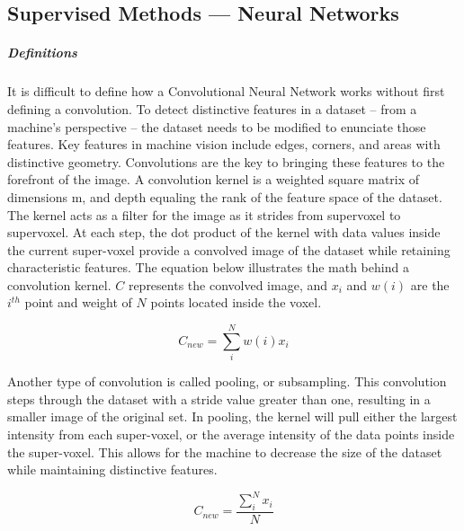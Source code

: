 \documentclass[12pt]{drexelthesis}
\let\Oldsubsection\subsection
\renewcommand{\subsection}{\FloatBarrier\Oldsubsection}
\begin{document}
\subsection{Supervised Methods --- Neural Networks}
\subparagraph{Definitions}
It is difficult to define how a Convolutional Neural Network works without first defining a convolution. To detect distinctive features in a dataset – from a machine’s perspective – the dataset needs to be modified to enunciate those features. Key features in machine vision include edges, corners, and areas with distinctive geometry. Convolutions are the key to bringing these features to the forefront of the image.
A convolution kernel is a weighted square matrix of dimensions m, and depth equaling the rank of the feature space of the dataset. The kernel acts as a filter for the image as it strides from supervoxel to supervoxel. At each step, the dot product of the kernel with data values inside the current super-voxel provide a convolved image of the dataset while retaining characteristic features. The equation below illustrates the math behind a convolution kernel. $C$ represents the convolved image, and $x_{i}$ and $w(i)$ are the $i^{th}$ point and weight of $N$ points located inside the voxel.

\begin{equation}
	C_{new} = \sum_{i}^{N}  w(i) x_{i}
\end{equation}

Another type of convolution is called pooling, or subsampling. This convolution steps through the dataset with a stride value greater than one, resulting in a smaller image of the original set. In pooling, the kernel will pull either the largest intensity from each super-voxel, or the average intensity of the data points inside the super-voxel. This allows for the machine to decrease the size of the dataset while maintaining distinctive features.

\begin{equation}
	C_{new} = \frac{\sum_{i}^{N}  x_{i}}{N}
\end{equation}
\end{document}

